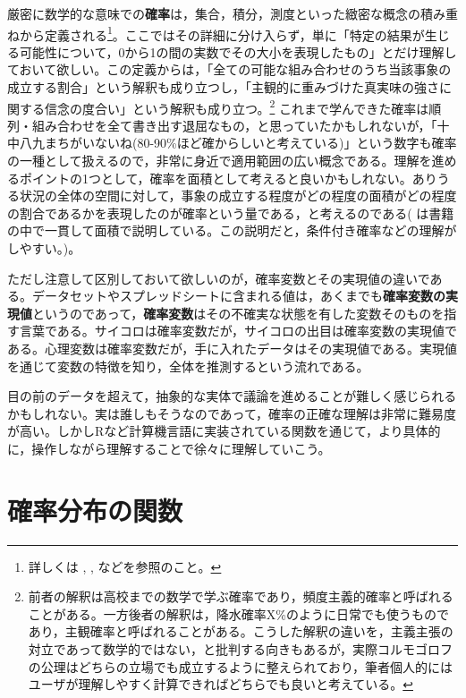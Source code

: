 \documentclass[
  a4paper,
]{ltjsbook}
\begin{document}
厳密に数学的な意味での\textbf{確率}は，集合，積分，測度といった緻密な概念の積み重ねから定義される\footnote{詳しくは
  \autocite{Yoshida2021-02-25} , \autocite{Kono1999-05-01},
  \autocite{Sato1994-02-25} などを参照のこと。}。ここではその詳細に分け入らず，単に「特定の結果が生じる可能性について，0から1の間の実数でその大小を表現したもの」とだけ理解しておいて欲しい。この定義からは，「全ての可能な組み合わせのうち当該事象の成立する割合」という解釈も成り立つし，「主観的に重みづけた真実味の強さに関する信念の度合い」という解釈も成り立つ。\footnote{前者の解釈は高校までの数学で学ぶ確率であり，頻度主義的確率と呼ばれることがある。一方後者の解釈は，降水確率X\%のように日常でも使うものであり，主観確率と呼ばれることがある。こうした解釈の違いを，主義主張の対立であって数学的ではない，と批判する向きもあるが，実際コルモゴロフの公理はどちらの立場でも成立するように整えられており，筆者個人的にはユーザが理解しやすく計算できればどちらでも良いと考えている。}
これまで学んできた確率は順列・組み合わせを全て書き出す退屈なもの，と思っていたかもしれないが，「十中八九まちがいないね(80-90\%ほど確からしいと考えている)」という数字も確率の一種として扱えるので，非常に身近で適用範囲の広い概念である。理解を進めるポイントの1つとして，確率を面積として考えると良いかもしれない。ありうる状況の全体の空間に対して，事象の成立する程度がどの程度の面積がどの程度の割合であるかを表現したのが確率という量である，と考えるのである(
\autocite{Hiraoka200910}
は書籍の中で一貫して面積で説明している。この説明だと，条件付き確率などの理解がしやすい。)。

ただし注意して区別しておいて欲しいのが，確率変数とその実現値の違いである。データセットやスプレッドシートに含まれる値は，あくまでも\textbf{確率変数の実現値}というのであって，\textbf{確率変数}はその不確実な状態を有した変数そのものを指す言葉である。サイコロは確率変数だが，サイコロの出目は確率変数の実現値である。心理変数は確率変数だが，手に入れたデータはその実現値である。実現値を通じて変数の特徴を知り，全体を推測するという流れである。

目の前のデータを超えて，抽象的な実体で議論を進めることが難しく感じられるかもしれない。実は誰しもそうなのであって，確率の正確な理解は非常に難易度が高い。しかしRなど計算機言語に実装されている関数を通じて，より具体的に，操作しながら理解することで徐々に理解していこう。

\section{確率分布の関数}\label{ux78baux7387ux5206ux5e03ux306eux95a2ux6570}
\end{document}
